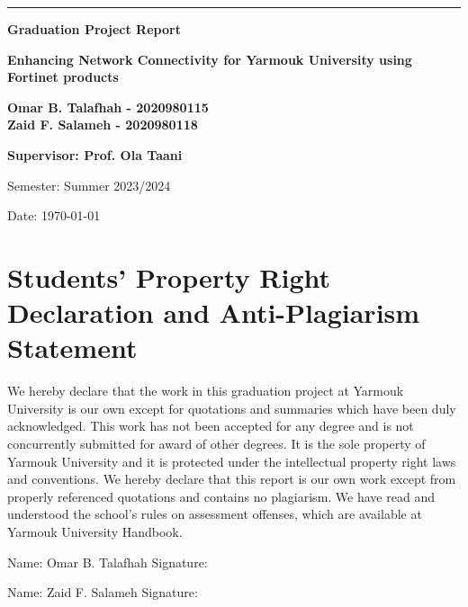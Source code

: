 \documentclass[12pt]{report}
\begin{document}
\begin{titlepage}
\thispagestyle{firstpage} %

   \vspace*{1.5cm} %
    \noindent\textcolor{darkred}{\rule{15.5cm}{1mm}}
    \vspace{2cm}
   \begin{center}
  
       {\Large\bfseries Graduation Project Report\par}
   \vspace{2cm} %
   {\huge\bfseries Enhancing Network Connectivity for Yarmouk University using Fortinet products\par}
   \vspace{2cm} %
   {\large\bfseries Omar B. Talafhah - 2020980115 \\ 
   Zaid F. Salameh - 2020980118 \par}
   \vspace{0.5cm}
   {\large\bfseries Supervisor: Prof. Ola Taani\par}
   \vfill %
   Semester: Summer 2023/2024\par
   Date: \today
   \end{center}
   \thispagestyle{firstpage} 
\end{titlepage}

\newpage
\section*{Students' Property Right Declaration and Anti-Plagiarism Statement}

We hereby declare that the work in this graduation project at Yarmouk University is our own except for quotations and summaries which have been duly acknowledged. This work has not been accepted for any degree and is not concurrently submitted for award of other degrees. It is the sole property of Yarmouk University and it is protected under the intellectual property right laws and conventions.
We hereby declare that this report is our own work except from properly referenced quotations and contains no plagiarism.
We have read and understood the school's rules on assessment offenses, which are available at Yarmouk University Handbook. \\
\begin{center}
\vspace{1cm}
Name: Omar B. Talafhah \hspace{3cm} Signature: 

Name: Zaid F. Salameh  \hspace{3.3cm} Signature: 


\end{center}
\end{document}
